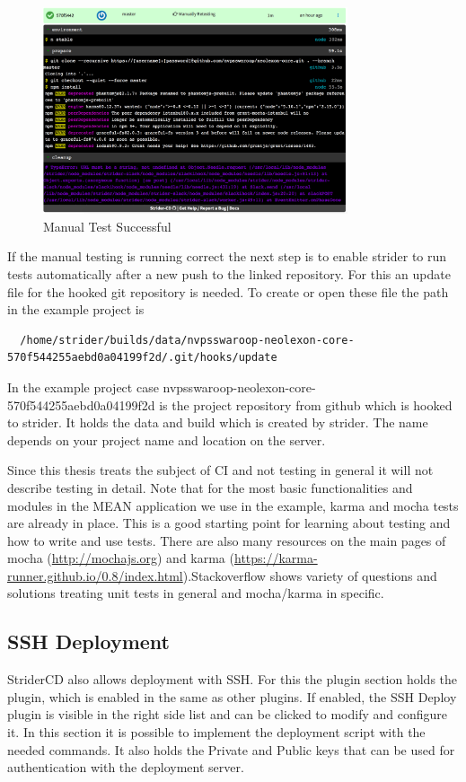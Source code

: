 \begin{figure}[h!]
  \centering
  \includegraphics[width=0.8\textwidth]{images/successfulManualTest.png}
  \caption{Manual Test Successful}
\end{figure}

If the manual testing is running correct the next step is to enable strider to run tests automatically after a new push to the
linked repository. For this an update file for the hooked git repository is needed. To create or open these file the path in
the example project is

\begin{lstlisting}
  /home/strider/builds/data/nvpsswaroop-neolexon-core-570f544255aebd0a04199f2d/.git/hooks/update
\end{lstlisting}

In the example project case nvpsswaroop-neolexon-core-570f544255aebd0a04199f2d is the project repository from github which is hooked to strider.
It holds the data and build which is created by strider. The name depends on your project name and location on the server.

Since this thesis treats the subject of CI and not testing in general it will not describe testing in detail. Note that for the
most basic functionalities and modules in the MEAN application we use in the example, karma and mocha tests are already in place.
This is a good starting point for learning about testing and how to write and use tests. There are also many resources
on the main pages of mocha (\url{http://mochajs.org}) and karma (\url{https://karma-runner.github.io/0.8/index.html}).Stackoverflow
shows variety of questions and solutions treating unit tests in general and mocha/karma in specific.

\subsection{SSH Deployment}
\label{section:SSH Deployment}
StriderCD also allows deployment with SSH. For this the plugin section holds the  plugin, which is enabled in the same
as other plugins. If enabled, the SSH Deploy plugin is visible in the right side list and can be clicked to modify and configure it. In this
section it is possible to implement the deployment script with the needed commands. It also holds the Private and Public keys that can be used
for authentication with the deployment server.

